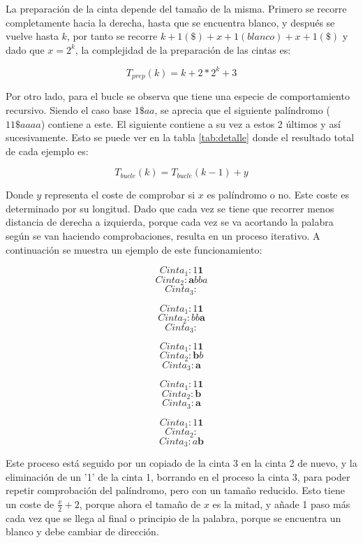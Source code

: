 \documentclass{uc3mpracticas}
\begin{document}
  La preparación de la cinta depende del tamaño de la misma. Primero se recorre completamente hacia la derecha, hasta que se encuentra blanco, y después se vuelve hasta $k$, por tanto se recorre $k + 1(\$) + x + 1(blanco) + x + 1(\$)$ y dado que $x=2^k$, la complejidad de la preparación de las cintas es:

  $$ T_{prep}(k) = k + 2*2^k + 3 $$

  \vspace{2mm}




  Por otro lado, para el bucle se observa que tiene una especie de comportamiento recursivo. Siendo el caso base $ 1\$aa $, se aprecia que el siguiente palíndromo ($11\$aaaa $) contiene a este. El siguiente contiene a su vez a estos 2 últimos y así sucesivamente. Esto se puede ver en la tabla \ref{tab:detalle} donde el resultado total de cada ejemplo es:


  $$ T_{bucle}(k) = T_{bucle}(k-1) + y $$




  Donde $y$ representa el coste de comprobar si $x$ es palíndromo o no. Este coste es determinado por su longitud. Dado que cada vez se tiene que recorrer menos distancia de derecha a izquierda, porque cada vez se va acortando la palabra según se van haciendo comprobaciones, resulta en un proceso iterativo. A continuación se muestra un ejemplo de este funcionamiento:

  $$ Cinta_1: 1\mathbf{1} $$
  $$ Cinta_2: \mathbf{a}bba $$
  $$ Cinta_3:  $$


  $$ Cinta_1: 1\mathbf{1} $$
  $$ Cinta_2: bb\mathbf{a} $$
  $$ Cinta_3:  $$


  $$ Cinta_1: 1\mathbf{1} $$
  $$ Cinta_2: \mathbf{b}b $$
  $$ Cinta_3: \mathbf{a} $$


  $$ Cinta_1: 1\mathbf{1} $$
  $$ Cinta_2: \mathbf{b} $$
  $$ Cinta_3: \mathbf{a} $$

  $$ Cinta_1: 1\mathbf{1} $$
  $$ Cinta_2: $$
  $$ Cinta_3: a\mathbf{b} $$

  Este proceso está seguido por un copiado de la cinta 3 en la cinta 2 de nuevo, y la eliminación de un '1' de la cinta 1, borrando en el proceso la cinta 3, para poder repetir comprobación del palíndromo, pero con un tamaño reducido. Esto tiene un coste de $\frac{x}{2} + 2$, porque ahora el tamaño de $x$ es la mitad, y añade 1 paso más cada vez que se llega al final o principio de la palabra, porque se encuentra un blanco y debe cambiar de dirección.
\end{document}
